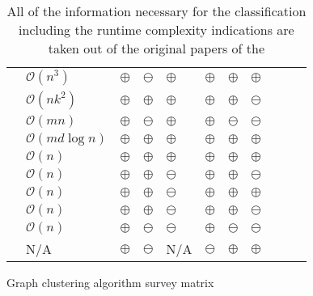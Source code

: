 \documentclass[12pt,a4paper]{report}
\begin{document}
\begin{table}[ht!]
\def\arraystretch{1.60}
\begin{tabularx}{\textwidth}{|Y||p{2.5cm}|Y|Y|Y|Y|Y|Y|Y|Y|Y|}
 \hline
  &  &  &  &  &  &  &  \\
 \hline\hline
 \cite{girvan2002community}     & \(\mathcal{O}(n^3)\)          & $\oplus$  & $\ominus$  & $\oplus$   & $\oplus$  & $\oplus$  & $\oplus$ \\\hline
 \cite{vandongen2000graph}      & \(\mathcal{O}(nk^2)\)         & $\oplus$  & $\oplus$   & $\oplus$   & $\oplus$  & $\oplus$  & $\ominus$ \\\hline
 \cite{pons2005computing}       & \(\mathcal{O}(mn)\)           & $\oplus$  & $\ominus$  & $\oplus$   & $\oplus$  & $\ominus$ & $\ominus$ \\\hline
 \cite{clauset2004modularity}   & \(\mathcal{O}(md \log{n})\)   & $\oplus$  & $\oplus$   & $\oplus$   & $\oplus$  & $\oplus$  & $\oplus$ \\\hline
 \cite{blondel2008modularity}   & \(\mathcal{O}(n)\)            & $\oplus$  & $\oplus$   & $\oplus$   & $\oplus$  & $\oplus$  & $\oplus$ \\\hline
 \cite{raghavan2007lpa}         & \(\mathcal{O}(n)\)            & $\oplus$  & $\oplus$   & $\ominus$  & $\oplus$  & $\oplus$  & $\ominus$ \\\hline
 \cite{rosvall2008infomap}      & \(\mathcal{O}(n)\)            & $\oplus$  & $\oplus$   & $\ominus$  & $\oplus$  & $\oplus$  & $\oplus$ \\\hline
 \cite{biemann2006chinese}      & \(\mathcal{O}(n)\)            & $\oplus$  & $\oplus$   & $\ominus$  & $\oplus$  & $\oplus$  & $\ominus$ \\\hline
 \cite{reichardt2004detecting}  & \(\mathcal{O}(n)\)            & $\oplus$  & $\ominus$  & $\ominus$  & $\oplus$  & $\ominus$ & $\ominus$ \\\hline
 \cite{donetti2004detecting}    & N/A                           & $\oplus$  & $\ominus$  & N/A        & $\ominus$ & $\oplus$  & $\oplus$ \\\hline
\end{tabularx}
\caption{Graph clustering algorithm survey matrix}
\caption*{\centering
  All of the information necessary for the classification including the
  runtime complexity indications are taken out of the original papers of the
}
\end{table}
\end{document}
